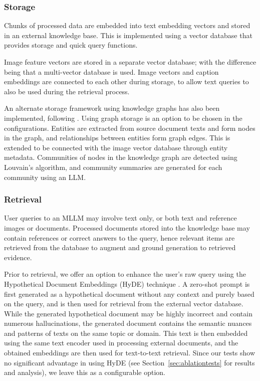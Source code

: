 \subsubsection{Storage}

Chunks of processed data are embedded into text embedding vectors and stored in an external knowledge base.
This is implemented using a vector database that provides storage and quick query functions. 

Image feature vectors are stored in a separate vector database; with the difference being that a multi-vector database is used. 
Image vectors and caption embeddings are connected to each other during storage, to allow text queries to also be used during the retrieval process. 

An alternate storage framework using knowledge graphs has also been implemented, following \cite{edge2025localglobalgraphrag}. 
Using graph storage is an option to be chosen in the configurations.
Entities are extracted from source document texts and form nodes in the graph, and relationships between entities form graph edges. 
This is extended to be connected with the image vector database through entity metadata. 
Communities of nodes in the knowledge graph are detected using Louvain's algorithm, 
and community summaries are generated for each community using an LLM. 

\subsubsection{Retrieval}
\label{sec:retrieval}

User queries to an MLLM may involve text only, or both text and reference images or documents. 
Processed documents stored into the knowledge base may contain references or correct answers to the query, 
hence relevant items are retrieved from the database to augment and ground generation to retrieved evidence. 

Prior to retrieval, we offer an option to enhance the user's raw query using the Hypothetical Document Embeddings (HyDE) technique \cite{gao-etal-2023-precise}.
A zero-shot prompt is first generated as a hypothetical document without any context and purely based on the query,
and is then used for retrieval from the external vector database.
While the generated hypothetical document may be highly incorrect and contain numerous hallucinations,
the generated document contains the semantic nuances and patterns of texts on the same topic or domain.
This text is then embedded using the same text encoder used in processing external documents,
and the obtained embeddings are then used for text-to-text retrieval.
Since our tests show no significant advantage in using HyDE (see Section~\ref{sec:ablationtests}  for results and analysis),
we leave this as a configurable option.

